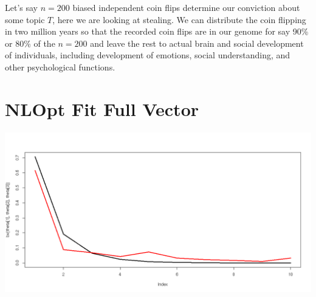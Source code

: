 \documentclass{amsart}
\begin{document}
Let's say $n=200$ biased independent coin flips determine our conviction about some topic $T$, here we are looking at stealing.  We can distribute the coin flipping in two million years so that the recorded coin flips are in our genome for say 90\% or 80\% of the $n=200$ and leave the rest to actual brain and social development of individuals, including development of emotions, social understanding, and other psychological functions.  

\section{NLOpt Fit Full Vector}

\includegraphics[angle=180,scale=-.3]{nlopt_fit_scaled_binomial_Q187.png}
\end{document}
